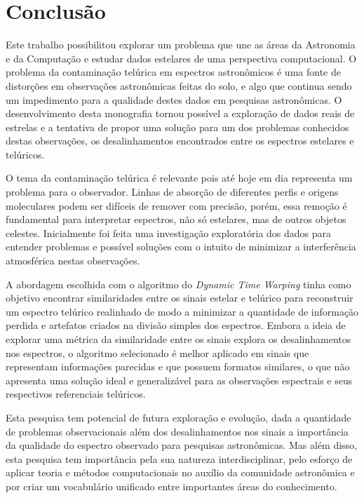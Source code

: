 \chapter{Conclusão}
\label{cap:conclusoes}


Este trabalho possibilitou explorar um problema que une as áreas da Astronomia e da Computação e estudar dados estelares de uma perspectiva computacional. O problema da contaminação telúrica em espectros astronômicos é uma fonte de distorções em observações astronômicas feitas do solo, e algo que continua sendo um impedimento para a qualidade destes dados em pesquisas astronômicas. O desenvolvimento desta monografia tornou possível a exploração de dados reais de estrelas e a tentativa de propor uma solução para um dos problemas conhecidos destas observações, os desalinhamentos encontrados entre os espectros estelares e telúricos.  

O tema da contaminação telúrica é relevante pois até hoje em dia representa um problema para o observador. Linhas de absorção de diferentes perfis e origens moleculares podem ser difíceis de remover com precisão, porém, essa remoção é fundamental para interpretar espectros, não só estelares, mas de outros objetos celestes. Inicialmente foi feita uma investigação exploratória dos dados para entender problemas e possível soluções com o intuito de minimizar a interferência atmosférica nestas observações.

A abordagem escolhida com o algoritmo do \textit{Dynamic Time Warping} tinha como objetivo encontrar similaridades entre os sinais estelar e telúrico para reconstruir um espectro telúrico realinhado de modo a minimizar a quantidade de informação perdida e artefatos criados na divisão simples dos espectros. Embora a ideia de explorar uma métrica da similaridade entre os sinais explora os desalinhamentos nos espectros, o algoritmo selecionado é melhor aplicado em sinais que representam informações parecidas e que possuem formatos similares, o que não apresenta uma solução ideal e generalizável para as observações espectrais e seus respectivos referenciais telúricos.   

Esta pesquisa tem potencial de futura exploração e evolução, dada a quantidade de problemas observacionais além dos desalinhamentos nos sinais a importância da qualidade do espectro observado para pesquisas astronômicas. Mas além disso, esta pesquisa tem importância pela sua natureza interdisciplinar, pelo esforço de aplicar teoria e métodos computacionais no auxílio da comunidade astronômica e por criar um vocabulário unificado entre importantes áreas do conhecimento.